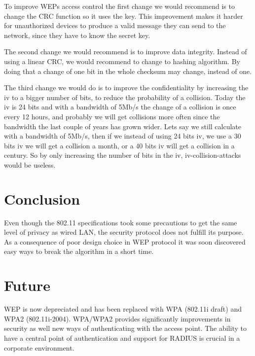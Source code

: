 \documentclass[twocolumn,11pt]{IEEEtran}
\begin{document}
To improve WEPs access control the first change we would recommend is to change the CRC function so it uses the key. This improvement makes it harder for unauthorized devices to produce a valid message they can send to the network, since they have to know the secret key. 

The second change we would recommend is to improve data integrity. Instead of using a linear CRC, we would recommend to change to hashing algorithm. By doing that a change of one bit in the whole checksum may change, instead of one. 

The third change we would do is to improve the confidentiality by increasing the iv to a bigger number of bits, to reduce the probability of a collision. Today the iv is 24 bits and with a bandwidth of 5Mb/s the change of a collision is once every 12 hours, and probably we will get collisions more often since the bandwidth the last couple of years has grown wider. Lets say we still calculate with a bandwidth of 5Mb/s, then if we instead of using 24 bits iv, we use a 30 bits iv we will get a collision a month, or a 40 bits iv will get a collision in a century. So by only increasing the number of bits in the iv, iv-collision-attacks would be useless.

\section {Conclusion}
\label{sec:conclusion}

Even though the 802.11 specifications took some precautions to get the same level of privacy as wired LAN, the security protocol does not fulfill its purpose. As a consequence of poor design choice in WEP protocol it was soon discovered easy ways to break the algorithm in a short time. 

\section {Future}
\label{sec:future}

WEP is now depreciated and has been replaced with WPA (802.11i draft) and WPA2 (802.11i-2004). WPA/WPA2 provides significantly improvements in security as well new ways of authenticating with the access point. The ability to have a central point  of authentication and support for RADIUS is crucial in a corporate environment.





\end{document}
